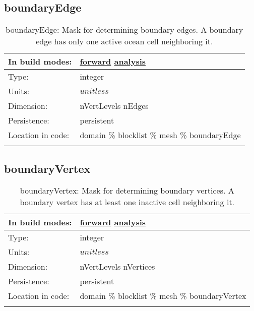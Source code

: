 \subsection[boundaryEdge]{boundaryEdge}
\label{subsec:var_sec_mesh_boundaryEdge}
\begin{center}
\begin{longtable}{| p{2.0in} | p{4.0in} |}
        \hline 
        In build modes: & \hyperref[subsec:forward_var_tab_mesh]{forward} \hyperref[subsec:analysis_var_tab_mesh]{analysis} \\
        \hline 
        Type: & integer \\
        \hline 
        Units: & $unitless$ \\
        \hline 
        Dimension: & nVertLevels nEdges \\
        \hline 
        Persistence: & persistent \\
        \hline 
		 Location in code: & domain \% blocklist \% mesh \% boundaryEdge \\
		 \hline 
    \caption{boundaryEdge: Mask for determining boundary edges. A boundary edge has only one active ocean cell neighboring it.}
\end{longtable}
\end{center}
\subsection[boundaryVertex]{boundaryVertex}
\label{subsec:var_sec_mesh_boundaryVertex}
\begin{center}
\begin{longtable}{| p{2.0in} | p{4.0in} |}
        \hline 
        In build modes: & \hyperref[subsec:forward_var_tab_mesh]{forward} \hyperref[subsec:analysis_var_tab_mesh]{analysis} \\
        \hline 
        Type: & integer \\
        \hline 
        Units: & $unitless$ \\
        \hline 
        Dimension: & nVertLevels nVertices \\
        \hline 
        Persistence: & persistent \\
        \hline 
		 Location in code: & domain \% blocklist \% mesh \% boundaryVertex \\
		 \hline 
    \caption{boundaryVertex: Mask for determining boundary vertices. A boundary vertex has at least one inactive cell neighboring it.}
\end{longtable}
\end{center}

